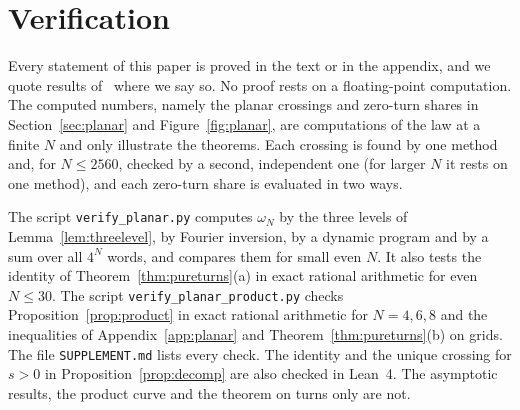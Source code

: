 \section{Verification}\label{sec:verify}

Every statement of this paper is proved in the text or in the appendix, and we
quote results of~\cite{paperA} where we say so. No proof rests on a
floating-point computation. The computed numbers, namely the planar crossings
and zero-turn shares in Section~\ref{sec:planar} and Figure~\ref{fig:planar},
are computations of the law at a finite $N$ and only illustrate the theorems.
Each crossing is found by one method and, for $N\le2560$, checked by a second,
independent one (for larger $N$ it rests on one method), and each zero-turn
share is evaluated in two ways.

The script \texttt{verify\_planar.py} computes $\omega_N$ by the three levels of
Lemma~\ref{lem:threelevel}, by Fourier inversion, by a dynamic program and by a
sum over all $4^N$ words, and compares them for small even $N$. It also tests
the identity of Theorem~\ref{thm:pureturns}(a) in exact rational arithmetic for
even $N\le30$. The script \texttt{verify\_planar\_product.py} checks
Proposition~\ref{prop:product} in exact rational arithmetic for $N=4,6,8$ and
the inequalities of Appendix~\ref{app:planar} and Theorem~\ref{thm:pureturns}(b)
on grids. The file \nolinkurl{SUPPLEMENT.md} lists every check. The identity
and the unique crossing for $s>0$ in Proposition~\ref{prop:decomp} are also
checked in Lean~4. The asymptotic results, the product curve and the theorem on
turns only are not.
